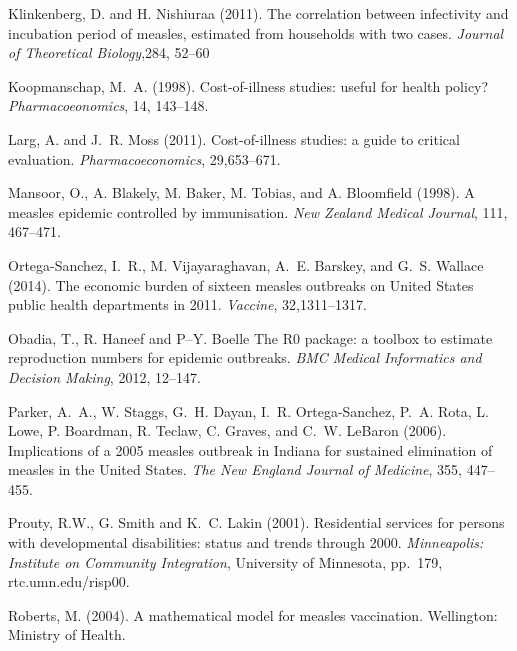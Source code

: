 \documentclass{article}
\begin{document}
\begin{thebibliography}{}
Klinkenberg, D. and H. Nishiuraa (2011).
\newblock The correlation between infectivity and incubation period of measles, estimated from households with two cases.
\newblock \emph{Journal of Theoretical Biology},284, 52--60

Koopmanschap, M.~A. (1998).
\newblock Cost-of-illness studies: useful for health policy?
\newblock \emph{Pharmacoeonomics}, 14, 143--148.

Larg, A. and J.~R. Moss (2011).
\newblock Cost-of-illness studies: a guide to critical evaluation.
\newblock \emph{Pharmacoeconomics}, 29,653--671.

Mansoor, O., A. Blakely, M. Baker, M. Tobias, and A. Bloomfield (1998).
\newblock A measles epidemic controlled by immunisation. 
\newblock \emph{New Zealand Medical Journal}, 111, 467--471.

Ortega-Sanchez, I.~R., M. Vijayaraghavan, A.~E. Barskey, and G.~S. Wallace (2014).
\newblock The economic burden of sixteen measles outbreaks on United States public health departments in 2011.
\newblock \emph{Vaccine}, 32,1311--1317.

Obadia, T., R. Haneef and P--Y. Boelle
\newblock The R0 package: a toolbox to estimate reproduction numbers for epidemic outbreaks.
\newblock \emph{BMC Medical Informatics and Decision Making}, 2012, 12--147.

Parker, A.~A., W. Staggs, G.~H. Dayan, I.~R. Ortega-Sanchez, P.~A. Rota, L. Lowe, P. Boardman, R. Teclaw, C. Graves, and C.~W. LeBaron (2006).
\newblock Implications of a 2005 measles outbreak in Indiana for sustained elimination of measles in the United States.
\newblock \emph{The New England Journal of Medicine}, 355, 447--455.

Prouty, R.W., G. Smith and K.~C. Lakin (2001).
\newblock Residential services for persons with developmental disabilities: status and trends through 2000.
\newblock \emph{Minneapolis: Institute on Community Integration}, University of Minnesota, pp.~179, rtc.umn.edu/risp00.

Roberts, M. (2004).
\newblock A mathematical model for measles vaccination.
\newblock Wellington: Ministry of Health.


\end{thebibliography}
\end{document}
